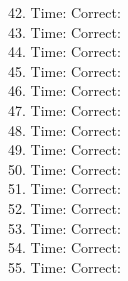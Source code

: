 \documentclass[12pt, letterpaper]{article}
\begin{document}
\begin{multicols}{2}
{42. Time: \underline{\hspace{6em}}\quad Correct: \underline{\hspace{3em}}\\
43. Time: \underline{\hspace{6em}}\quad Correct: \underline{\hspace{3em}}\\
44. Time: \underline{\hspace{6em}}\quad Correct: \underline{\hspace{3em}}\\
45. Time: \underline{\hspace{6em}}\quad Correct: \underline{\hspace{3em}}\\
46. Time: \underline{\hspace{6em}}\quad Correct: \underline{\hspace{3em}}\\
47. Time: \underline{\hspace{6em}}\quad Correct: \underline{\hspace{3em}}\\
48. Time: \underline{\hspace{6em}}\quad Correct: \underline{\hspace{3em}}\\
49. Time: \underline{\hspace{6em}}\quad Correct: \underline{\hspace{3em}}\\
50. Time: \underline{\hspace{6em}}\quad Correct: \underline{\hspace{3em}}\\
51. Time: \underline{\hspace{6em}}\quad Correct: \underline{\hspace{3em}}\\
52. Time: \underline{\hspace{6em}}\quad Correct: \underline{\hspace{3em}}\\
53. Time: \underline{\hspace{6em}}\quad Correct: \underline{\hspace{3em}}\\
54. Time: \underline{\hspace{6em}}\quad Correct: \underline{\hspace{3em}}\\
55. Time: \underline{\hspace{6em}}\quad Correct: \underline{\hspace{3em}}\\
}
\end{multicols}
\end{document}
